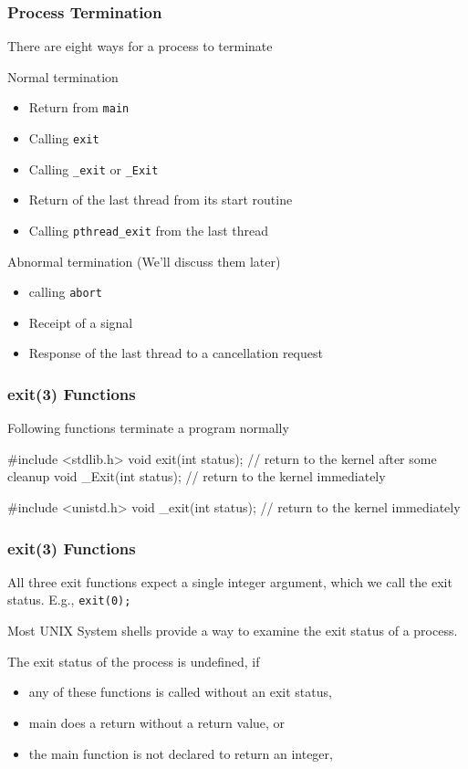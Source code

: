 \documentclass[newPxFont,sthlmFooter,nooffset]{beamer}
\begin{document}
\begin{frame}[t]
  \frametitle{Process Termination}

There are eight ways for a process to terminate

Normal termination
\begin{itemize}
\item Return from \texttt{main}
\item Calling \texttt{exit}
\item Calling \texttt{\_exit} or \texttt{\_Exit}
\item Return of the last thread from its start routine
\item Calling \texttt{pthread\_exit} from the last thread
\end{itemize}

Abnormal termination (We'll discuss them later)
\begin{itemize}
\item calling \texttt{abort}
\item Receipt of a signal
\item Response of the last thread to a cancellation request
\end{itemize}

\end{frame}

\begin{frame}[containsverbatim,t]
  \frametitle{exit(3) Functions}
Following functions terminate a program normally
\begin{codedef}
#include <stdlib.h> 
void exit(int status); // return to the kernel after some cleanup
void _Exit(int status); // return to the kernel immediately 

#include <unistd.h> 
void _exit(int status);  // return to the kernel immediately
\end{codedef}

\end{frame}

\begin{frame}[t]
  \frametitle{exit(3) Functions}
All three exit functions expect a single integer argument, which we
call the exit status. E.g., \texttt{exit(0);}

Most UNIX System shells provide a way to examine the exit status of a
process.

The exit status of the process is undefined, if
\begin{itemize}
\item any of these functions is called without an exit status,
\item main does a return without a return value, or
\item the main function is not declared to return an integer,
\end{itemize}

\end{frame}
\end{document}
